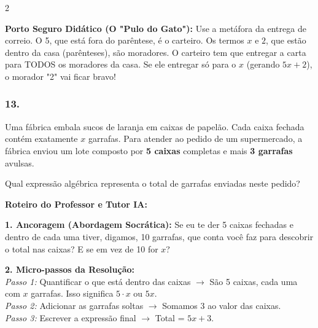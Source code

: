 \begin{multicols*}{2}
    \begin{boxexplicacao}
    \textbf{Porto Seguro Didático (O "Pulo do Gato"):} Use a metáfora da entrega de correio. O 5, que está fora do parêntese, é o carteiro. Os termos $x$ e $2$, que estão dentro da casa (parênteses), são moradores. O carteiro tem que entregar a carta para TODOS os moradores da casa. Se ele entregar só para o $x$ (gerando $5x+2$), o morador "2" vai ficar bravo!
    \end{boxexplicacao}
\fi

\par\vspace{\espacoQuestao}
\subsubsection*{13.} 
\begin{enunciadoLiteral}
Uma fábrica embala sucos de laranja em caixas de papelão. Cada caixa fechada contém exatamente $x$ garrafas. Para atender ao pedido de um supermercado, a fábrica enviou um lote composto por \textbf{5 caixas} completas e mais \textbf{3 garrafas} avulsas. 

Qual expressão algébrica representa o total de garrafas enviadas neste pedido? 
\end{enunciadoLiteral}

\ifgabarito
    \begin{tcolorbox}[colback=CorTitUm!5, colframe=CorTitUm, boxrule=1pt, arc=4pt, left=6pt, right=6pt, top=6pt, bottom=6pt]
    \small\textbf{\textcolor{CorTitUm}{Roteiro do Professor e Tutor IA:}}\par\vspace{0.1cm}
    \color{CinzaEscuro}
    \textbf{1. Ancoragem (Abordagem Socrática):} Se eu te der 5 caixas fechadas e dentro de cada uma tiver, digamos, 10 garrafas, que conta você faz para descobrir o total nas caixas? E se em vez de 10 for $x$?\par\vspace{0.1cm}
    
    \textbf{2. Micro-passos da Resolução:}\\
    \textit{Passo 1:} Quantificar o que está dentro das caixas $\rightarrow$ São 5 caixas, cada uma com $x$ garrafas. Isso significa $ 5 \cdot x $ ou $ 5x $.\\
    \textit{Passo 2:} Adicionar as garrafas soltas $\rightarrow$ Somamos 3 ao valor das caixas.\\
    \textit{Passo 3:} Escrever a expressão final $\rightarrow$ Total = $ 5x + 3 $.\par\vspace{0.1cm}
    

\end{tcolorbox}
\end{multicols*}
